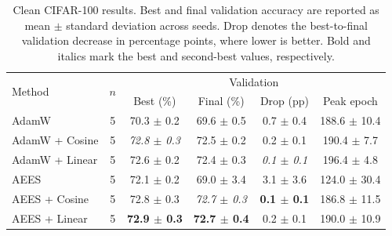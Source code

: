 \begin{table}[t]
\centering
\small
\setlength{\tabcolsep}{5pt}
\begin{tabular}{lccccc}
\toprule
\multirow{2}{*}{Method} & \multirow{2}{*}{$n$} & \multicolumn{4}{c}{Validation} \\
& & Best (\%) & Final (\%) & Drop (pp) & Peak epoch \\
\midrule
AdamW & 5 & 70.3 $\pm$ 0.2 & 69.6 $\pm$ 0.5 & 0.7 $\pm$ 0.4 & 188.6 $\pm$ 10.4 \\
AdamW + Cosine & 5 & \emph{72.8 $\pm$ 0.3} & 72.5 $\pm$ 0.2 & 0.2 $\pm$ 0.1 & 190.4 $\pm$ 7.7 \\
AdamW + Linear & 5 & 72.6 $\pm$ 0.2 & 72.4 $\pm$ 0.3 & \emph{0.1 $\pm$ 0.1} & 196.4 $\pm$ 4.8 \\
AEES & 5 & 72.1 $\pm$ 0.2 & 69.0 $\pm$ 3.4 & 3.1 $\pm$ 3.6 & 124.0 $\pm$ 30.4 \\
AEES + Cosine & 5 & 72.8 $\pm$ 0.3 & \emph{72.7 $\pm$ 0.3} & \textbf{0.1 $\pm$ 0.1} & 186.8 $\pm$ 11.5 \\
AEES + Linear & 5 & \textbf{72.9 $\pm$ 0.3} & \textbf{72.7 $\pm$ 0.4} & 0.2 $\pm$ 0.1 & 190.0 $\pm$ 10.9 \\
\bottomrule
\end{tabular}
\caption{Clean CIFAR-100 results. Best and final validation accuracy are reported as mean $\pm$ standard deviation across seeds. Drop denotes the best-to-final validation decrease in percentage points, where lower is better. Bold and italics mark the best and second-best values, respectively.}
\label{tab:cifar_clean_main}
\end{table}